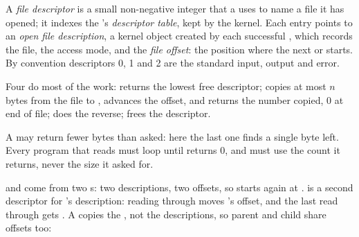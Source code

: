 \begin{definition}\label{def:b2:files-pipes-signals:descriptor}
A \emph{file descriptor} is a small non-negative integer that a  uses to name a file it
has opened; it indexes the 's \emph{descriptor table}, kept by the kernel. Each entry
points to an \emph{open file description}, a kernel object created by each successful
, which records the file, the access mode, and the \emph{file offset}: the position
where the next  or  starts. By convention descriptors 0, 1 and 2 are the standard input,
output and error.
\end{definition}

Four  do most of the work:  returns the lowest free descriptor;
 copies at most $n$ bytes from the file to , advances the offset, and returns the
number copied, 0 at end of file;  does the reverse;  frees the descriptor.


\label{out:b2:files-pipes-signals:fd}

A  may return fewer bytes than asked: here the last one finds a single byte left. Every program that reads
must loop until  returns 0, and must use the count it returns, never the size it asked for.


\label{out:b2:files-pipes-signals:offsets}

 and  come from two s: two descriptions, two offsets, so  starts again at
.  is a second descriptor for 's description: reading through  moves
's offset, and the last read through  gets . A  copies the , not
the descriptions, so parent and child share offsets too:

